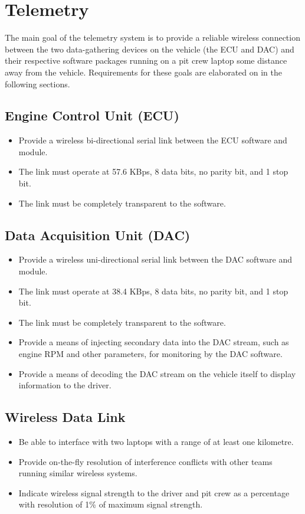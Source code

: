 \section{Telemetry}

The main goal of the telemetry system is to provide a reliable wireless connection between the two data-gathering devices on the vehicle (the ECU and DAC) and their respective software packages running on a pit crew laptop some distance away from the vehicle. Requirements for these goals are elaborated on in the following sections.

\subsection{Engine Control Unit (ECU)}

\begin{itemize}
\item Provide a wireless bi-directional serial link between the ECU software and module.
\item The link must operate at 57.6 KBps, 8 data bits, no parity bit, and 1 stop bit.
\item The link must be completely transparent to the software.
\end{itemize}

\subsection{Data Acquisition Unit (DAC)}

\begin{itemize}
\item Provide a wireless uni-directional serial link between the DAC software and module.
\item The link must operate at 38.4 KBps, 8 data bits, no parity bit, and 1 stop bit.
\item The link must be completely transparent to the software.
\item Provide a means of injecting secondary data into the DAC stream, such as engine RPM and other parameters, for monitoring by the DAC software.
\item Provide a means of decoding the DAC stream on the vehicle itself to display information to the driver.
\end{itemize}

\subsection{Wireless Data Link}

\begin{itemize}

\item Be able to interface with two laptops with a range of at least one kilometre.
\item Provide on-the-fly resolution of interference conflicts with other teams running similar wireless systems.
\item Indicate wireless signal strength to the driver and pit crew as a percentage with resolution of 1\% of maximum signal
strength. 
\end{itemize}
